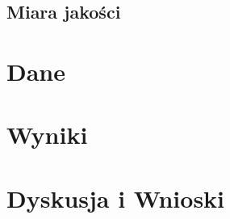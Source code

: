 \documentclass[licencjacka,openright]{pracamgr}
\begin{document}
\section{Miara jakości}




\chapter{Dane}

\chapter{Wyniki}

\chapter{Dyskusja i Wnioski}



\end{document}
